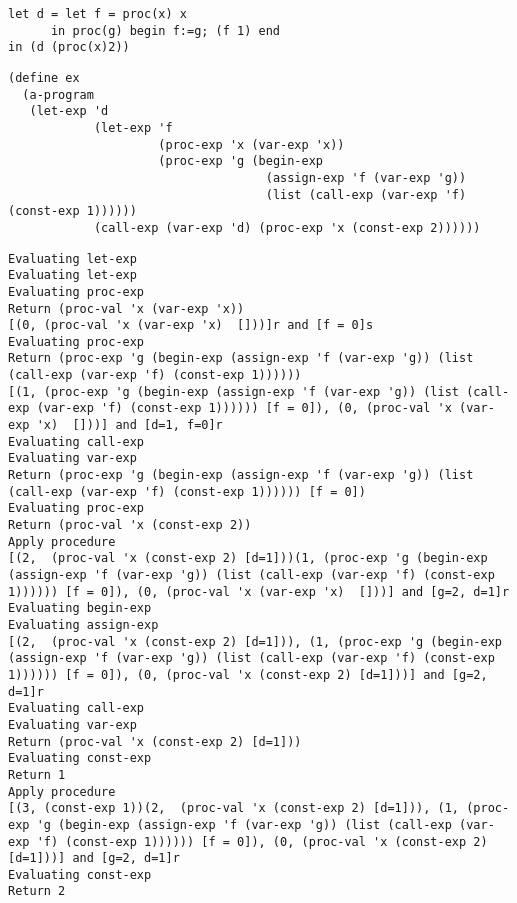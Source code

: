 \documentclass[../main.tex]{subfiles}
\begin{document}
\begin{lstlisting}
let d = let f = proc(x) x
      in proc(g) begin f:=g; (f 1) end
in (d (proc(x)2))
\end{lstlisting}

\begin{lstlisting}
(define ex
  (a-program
   (let-exp 'd
            (let-exp 'f
                     (proc-exp 'x (var-exp 'x))
                     (proc-exp 'g (begin-exp
                                    (assign-exp 'f (var-exp 'g))
                                    (list (call-exp (var-exp 'f) (const-exp 1))))))
            (call-exp (var-exp 'd) (proc-exp 'x (const-exp 2))))))
\end{lstlisting}

\begin{lstlisting}
Evaluating let-exp
Evaluating let-exp
Evaluating proc-exp
Return (proc-val 'x (var-exp 'x))
[(0, (proc-val 'x (var-exp 'x)  []))]r and [f = 0]s
Evaluating proc-exp
Return (proc-exp 'g (begin-exp (assign-exp 'f (var-exp 'g)) (list (call-exp (var-exp 'f) (const-exp 1))))))
[(1, (proc-exp 'g (begin-exp (assign-exp 'f (var-exp 'g)) (list (call-exp (var-exp 'f) (const-exp 1)))))) [f = 0]), (0, (proc-val 'x (var-exp 'x)  []))] and [d=1, f=0]r
Evaluating call-exp
Evaluating var-exp
Return (proc-exp 'g (begin-exp (assign-exp 'f (var-exp 'g)) (list (call-exp (var-exp 'f) (const-exp 1)))))) [f = 0])
Evaluating proc-exp
Return (proc-val 'x (const-exp 2))
Apply procedure
[(2,  (proc-val 'x (const-exp 2) [d=1]))(1, (proc-exp 'g (begin-exp (assign-exp 'f (var-exp 'g)) (list (call-exp (var-exp 'f) (const-exp 1)))))) [f = 0]), (0, (proc-val 'x (var-exp 'x)  []))] and [g=2, d=1]r
Evaluating begin-exp
Evaluating assign-exp
[(2,  (proc-val 'x (const-exp 2) [d=1])), (1, (proc-exp 'g (begin-exp (assign-exp 'f (var-exp 'g)) (list (call-exp (var-exp 'f) (const-exp 1)))))) [f = 0]), (0, (proc-val 'x (const-exp 2) [d=1]))] and [g=2, d=1]r
Evaluating call-exp
Evaluating var-exp
Return (proc-val 'x (const-exp 2) [d=1]))
Evaluating const-exp
Return 1
Apply procedure
[(3, (const-exp 1))(2,  (proc-val 'x (const-exp 2) [d=1])), (1, (proc-exp 'g (begin-exp (assign-exp 'f (var-exp 'g)) (list (call-exp (var-exp 'f) (const-exp 1)))))) [f = 0]), (0, (proc-val 'x (const-exp 2) [d=1]))] and [g=2, d=1]r
Evaluating const-exp
Return 2
\end{lstlisting}
\end{document}
